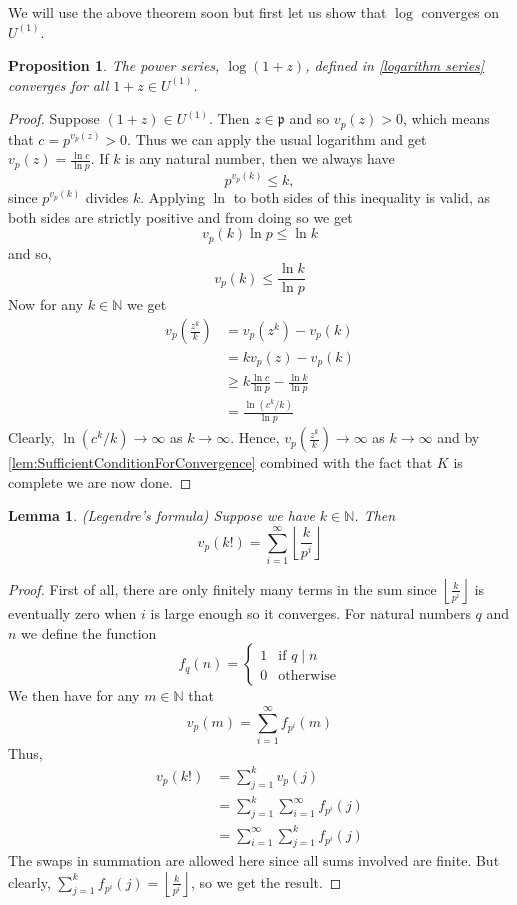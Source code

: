 \documentclass{article}
\newtheorem{proposition}{Proposition}[section]
\newtheorem{lemma}{Lemma}[section]
\newcommand{\mfrak}[1]{\mathfrak{#1}}
\newcommand{\mbb}[1]{\mathbb{#1}}
\numberwithin{equation}{section}
\begin{document}
We will use the above theorem soon but first let us show that $\log$ converges on $U^{(1)}$.
\begin{proposition}
	The power series, $\log(1+z)$, defined in \cref{logarithm series} converges for all $1+z \in U^{(1)}$.
\end{proposition}
\begin{proof}
	Suppose $(1 + z) \in U^{(1)}$. Then $z \in \mfrak p$ and so $v_p(z) > 0$, which means that $c = p^{v_p(z)} > 0$. Thus we can apply the usual logarithm and get $v_p(z) = \frac{\ln c}{\ln p}$. If $k$ is any natural number, then we always have $$p^{v_p(k)} \leq k,$$ since $p^{v_p(k)}$ divides $k$. Applying $\ln$ to both sides of this inequality is valid, as both sides are strictly positive and from doing so we get
	$$v_p(k) \ln p \leq \ln k$$
	and so,
	$$v_p(k) \leq \frac{\ln k}{\ln p}$$
	Now for any $k \in \mbb N$ we get
	\begin{align*}
    	v_p(\frac{z^k}{k}) & = v_p(z^k) - v_p(k)                          	\\
                       	& = kv_p(z) - v_p(k)                           	\\
                       	& \geq k \frac{\ln c}{\ln p} - \frac{\ln k}{\ln p} \\
                       	& = \frac{\ln (c^k / k)}{\ln p}
	\end{align*}
	Clearly, $\ln (c^k / k) \to \infty$ as $k \to \infty$. Hence, $v_p(\frac{z^k}{k}) \to \infty$ as $k \to \infty$ and by \cref{lem:SufficientConditionForConvergence} combined with the fact that $K$ is complete we are now done.
\end{proof}

\begin{lemma}(Legendre's formula)
	Suppose we have $k \in \mbb N$. Then
	$$v_p(k!) = \sum_{i = 1}^{\infty} \left\lfloor \frac{k}{p^i} \right \rfloor$$
\end{lemma}

\begin{proof}
	First of all, there are only finitely many terms in the sum since $\left\lfloor \frac{k}{p^i} \right \rfloor$ is eventually zero when $i$ is large enough so it converges. For natural numbers $q$ and $n$ we define the function
	$$f_q(n) = \begin{cases}
        	1 & \text{if } q \mid n \\
        	0 & \text{otherwise}
    	\end{cases}$$
	We then have for any $m \in \mbb N$ that
	$$v_p(m) = \sum_{i = 1}^{\infty} f_{p^i}(m)$$
	Thus,
	\begin{align*}
    	v_p(k!) & = \sum_{j = 1}^k v_p(j)                       	\\
            	& = \sum_{j = 1}^k \sum_{i = 1}^{\infty} f_{p^i}(j) \\
            	& = \sum_{i = 1}^{\infty} \sum_{j = 1}^k f_{p^i}(j)
	\end{align*}
	The swaps in summation are allowed here since all sums involved are finite. But clearly, $\sum_{j = 1}^k f_{p^i}(j) = \left\lfloor \frac{k}{p^i} \right \rfloor$, so we get the result.
\end{proof}
\end{document}
